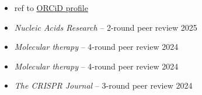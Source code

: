 






% 





\begin{itemize}
    \item[] \hfill ref to \href{https://orcid.org/0000-0002-4934-4731}{ORCiD profile}
    \item \textit{Nucleic Acids Research} -- 2-round peer review \hfill 2025
    \item \textit{Molecular therapy} -- 4-round peer review \hfill 2024
    \item \textit{Molecular therapy} -- 4-round peer review \hfill 2024
    \item \textit{The CRISPR Journal} -- 3-round peer review \hfill 2024
\end{itemize}



